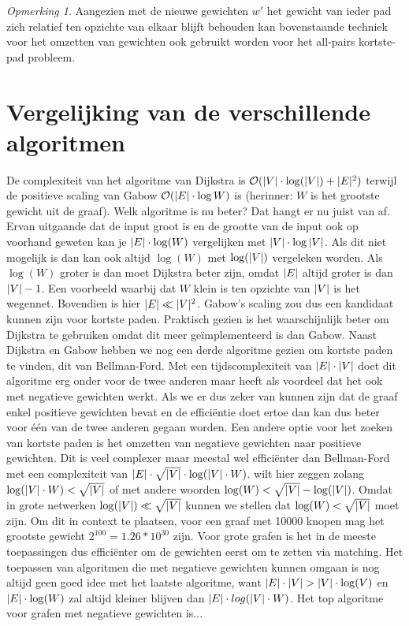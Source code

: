 \documentclass[conference]{IEEEtran}
\theoremstyle{definition}
\theoremstyle{remark}
\newtheorem*{remark}{Opmerking}
\DeclarePairedDelimiter{\card}{\vert}{\vert}  %
\begin{document}
\begin{remark}
    Aangezien met de nieuwe gewichten $w'$ het gewicht van ieder pad zich relatief ten opzichte van elkaar blijft behouden kan bovenstaande techniek voor het omzetten van gewichten ook gebruikt worden voor het all-pairs kortste-pad probleem.
\end{remark}

\section{Vergelijking van de verschillende algoritmen}
De complexiteit van het algoritme van Dijkstra is $\mathcal{O}(\card{V} \cdot \log(\card{V}) + \card{E}^2)$ terwijl de positieve scaling van Gabow $\mathcal{O}(\card{E} \cdot \log{W})$ is (herinner: $W$ is het grootste gewicht uit de graaf). Welk algoritme is nu beter? Dat hangt er nu juist van af. Ervan uitgaande dat de input groot is en de grootte van de input ook op voorhand geweten kan je $\card{E} \cdot \log(W)$ vergelijken met $\card{V} \cdot \log{\card{V}}$. Als dit niet mogelijk is dan kan ook altijd $\log(W)$ met $\log(\card{V})$ vergeleken worden. Als $\log(W)$ groter is dan moet Dijkstra beter zijn, omdat $\card{E}$ altijd groter is dan $\card{V} - 1$. Een voorbeeld waarbij dat $W$ klein is ten opzichte van $\card{V}$ is het wegennet. Bovendien is hier $\card{E} \ll \card{V}^{2}$. Gabow's scaling zou dus een kandidaat kunnen zijn voor kortste paden. Praktisch gezien is het waarschijnlijk beter om Dijkstra te gebruiken omdat dit meer geïmplementeerd is dan Gabow. \cite{BGL}
Naast Dijkstra en Gabow hebben we nog een derde algoritme gezien om kortste paden te vinden, dit van Bellman-Ford. Met een tijdscomplexiteit van $\card{E} \cdot \card{V}$ doet dit algoritme erg onder voor de twee anderen maar heeft als voordeel dat het ook met negatieve gewichten werkt. Als we er dus zeker van kunnen zijn dat de graaf enkel positieve gewichten bevat en de efficiëntie doet ertoe dan kan dus beter voor één van de twee anderen gegaan worden. Een andere optie voor het zoeken van kortste paden is het omzetten van negatieve gewichten naar positieve gewichten. Dit is veel complexer maar meestal wel efficiënter dan Bellman-Ford met een complexiteit van $\card{E} \cdot \sqrt{\card{V}} \cdot \log(\card{V} \cdot W)$.  wilt hier zeggen zolang $\log(\card{V} \cdot W) < \sqrt{\card{V}}$ of met andere woorden $\log(W) < \sqrt{\card{V}} - \log(\card{V})$. Omdat in grote netwerken $\log(\card{V}) \ll \sqrt{\card{V}}$ kunnen we stellen dat $\log(W) < \sqrt{\card{V}}$ moet zijn. Om dit in context te plaatsen, voor een graaf met 10000 knopen mag het grootste gewicht $2^{100} = 1.26*10^{30}$ zijn. Voor grote grafen is het in de meeste toepassingen dus efficiënter om de gewichten eerst om te zetten via matching.
Het toepassen van algoritmen die met negatieve gewichten kunnen omgaan is nog altijd geen goed idee met het laatste algoritme, want $\card{E} \cdot \card{V} > \card{V} \cdot \log(V)$ en $\card{E} \cdot \log(W)$ zal altijd kleiner blijven dan $\card{E} \cdot log(\card{V} \cdot W)$.
Het top algoritme voor grafen met negatieve gewichten is...
\end{document}
